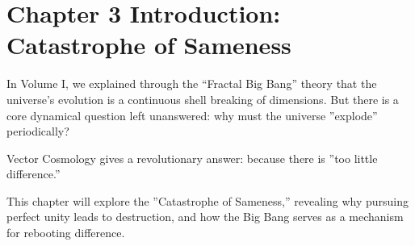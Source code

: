 \section*{Chapter 3 Introduction: Catastrophe of Sameness}

In Volume I, we explained through the ``Fractal Big Bang'' theory that the universe's evolution is a continuous shell breaking of dimensions. But there is a core dynamical question left unanswered: why must the universe ''explode'' periodically?

Vector Cosmology gives a revolutionary answer: because there is ''too little difference.''

This chapter will explore the ''Catastrophe of Sameness,'' revealing why pursuing perfect unity leads to destruction, and how the Big Bang serves as a mechanism for rebooting difference.

